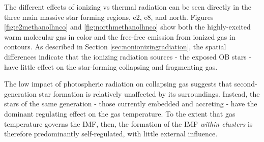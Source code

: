 \documentclass{aa}
\begin{document}
The different effects of ionizing vs thermal radiation can be seen directly in
the three main massive star forming regions, e2, e8, and north.  Figures
\ref{fig:e2methanolhnco} and \ref{fig:northmethanolhnco} show both the
highly-excited warm molecular gas in color and the free-free emission from
ionized gas in contours.  As described in Section
\ref{sec:nonionizingradiation}, the spatial differences indicate that the
ionizing radiation sources - the exposed OB stars - have little effect on the
star-forming collapsing and fragmenting gas.

The low impact of photospheric radiation on collapsing gas suggests that
second-generation star formation is relatively unaffected by its surroundings.
Instead, the stars of the same generation - those currently embedded and
accreting - have the dominant regulating effect on the gas temperature.  To the
extent that gas temperature governs the IMF, then, the formation of the IMF
\emph{within clusters} is therefore predominantly self-regulated, with little
external influence.



\end{document}
